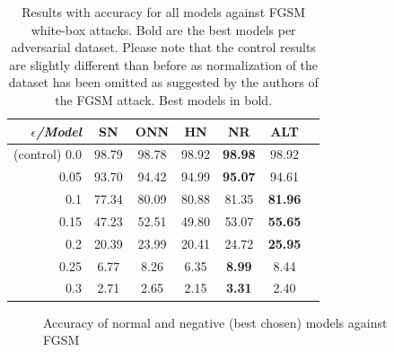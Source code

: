\documentclass[b5paper]{book}
\begin{document}
\begin{table}[ht]
  \centering
  \begin{tabular}{rS[table-format=2.1]S[table-format=2.1]S[table-format=2.1]S[table-format=2.1]S[table-format=2.1]S[table-format=2.1]}
    \toprule
     \textit{\(\epsilon\)/Model} & SN & ONN & HN & NR & ALT \\
    \midrule
    {(control) 0.0} & {98.79} & {98.78} & {98.92} & {\textbf{98.98}} & {98.92} \\
    {0.05} & {93.70} & {94.42} & {94.99} & {\textbf{95.07}} & {94.61} \\
    {0.1} & {77.34} & {80.09} & {80.88} & {81.35} & {\textbf{81.96}} \\
    {0.15} & {47.23} & {52.51} & {49.80} & {53.07} & {\textbf{55.65}} \\
    {0.2} & {20.39} & {23.99} & {20.41} & {24.72} & {\textbf{25.95}} \\
    {0.25} & {6.77} & {8.26} & {6.35} & {\textbf{8.99}} & {8.44} \\
    {0.3} & {2.71} & {2.65} & {2.15} & {\textbf{3.31}} & {2.40} \\
    \bottomrule
  \end{tabular}
  \caption{Results with accuracy for all models against FGSM white-box attacks. Bold are the best models per adversarial dataset. Please note that the control results are slightly different than before as normalization of the dataset has been omitted as suggested by the authors of the FGSM attack. Best models in bold.}
  \label{tab:results-fgsm}
\end{table} 

\begin{figure}
    \centering
    \caption{Accuracy of normal and negative (best chosen) models against FGSM}
    \label{fig:fgsm_chart}
\end{figure}
\end{document}
